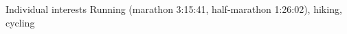 \documentclass{resume} %
\begin{document}

\begin{rSection}{Individual interests}
Running (marathon 3:15:41, half-marathon 1:26:02), hiking, cycling
\end{rSection}
\end{document}

